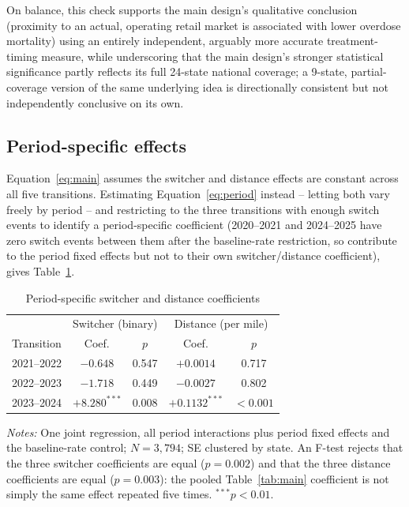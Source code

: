 \documentclass[11pt]{article}
\begin{document}
On balance, this check supports the main design's qualitative
conclusion (proximity to an actual, operating retail market is
associated with lower overdose mortality) using an entirely
independent, arguably more accurate treatment-timing measure, while
underscoring that the main design's stronger statistical significance
partly reflects its full 24-state national coverage; a 9-state,
partial-coverage version of the same underlying idea is directionally
consistent but not independently conclusive on its own.

\subsection{Period-specific effects}
\label{sec:periodeffects}

Equation~\ref{eq:main} assumes the switcher and distance effects are
constant across all five transitions. Estimating Equation~\ref{eq:period}
instead -- letting both vary freely by period -- and restricting to
the three transitions with enough switch events to identify a
period-specific coefficient (2020--2021 and 2024--2025 have zero
switch events between them after the baseline-rate restriction, so
contribute to the period fixed effects but not to their own
switcher/distance coefficient), gives Table~\ref{tab:period}.

\begin{table}[htbp]
\centering
\caption{Period-specific switcher and distance coefficients}
\label{tab:period}
\begin{tabular}{@{}lcccc@{}}
\toprule
 & \multicolumn{2}{c}{Switcher (binary)} & \multicolumn{2}{c}{Distance (per mile)} \\
Transition & Coef. & $p$ & Coef. & $p$ \\
\midrule
2021--2022 & $-0.648$ & 0.547 & $+0.0014$ & 0.717 \\
2022--2023 & $-1.718$ & 0.449 & $-0.0027$ & 0.802 \\
2023--2024 & $+8.280^{***}$ & 0.008 & $+0.1132^{***}$ & $<0.001$ \\
\bottomrule
\end{tabular}
\vspace{2pt}
\begin{minipage}{0.85\textwidth}
\footnotesize\emph{Notes:} One joint regression, all period
interactions plus period fixed effects and the baseline-rate control;
$N=3{,}794$; SE clustered by state. An F-test rejects that the three
switcher coefficients are equal ($p=0.002$) and that the three
distance coefficients are equal ($p=0.003$): the pooled
Table~\ref{tab:main} coefficient is not simply the same effect
repeated five times. $^{***}p<0.01$.
\end{minipage}
\end{table}
\end{document}
